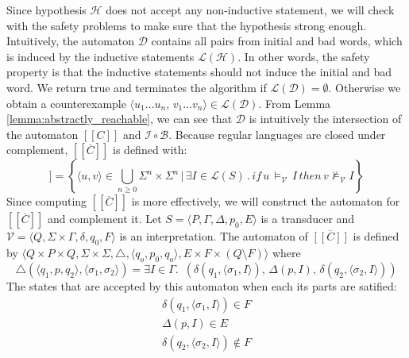 Since hypothesis $\mathcal{H}$ does not accept any 
non-inductive statement, we will check with the safety problems
to make sure that the hypothesis strong enough.
Intuitively, the automaton $\mathcal{D}$ contains all pairs from initial and bad words,
which is induced by the inductive statements $\mathcal{L}(\mathcal{H})$.
In other words, the safety property is that the inductive statements should not induce the
initial and bad word. We return true and terminates the algorithm if $\mathcal{L}(\mathcal{D}) = \emptyset$.
Otherwise we obtain a counterexample 
$\langle u_1 \dots u_n, \, v_1 \dots v_n \rangle \in \mathcal{L}(\mathcal{D})$.
From Lemma \ref{lemma:abstractly_reachable}, we can see that $\mathcal{D}$ is intuitively the intersection of
the automaton $[[C]]$ and $\mathcal{I} \circ  \mathcal{B}$.
Because regular languages are closed under complement, $[[\overline{C}]]$ is defined with:
\begin{equation}
    [[\overline{C}]] = \left\lbrace \langle u,v\rangle \in \bigcup_{n \geq 0} \Sigma^n \times \Sigma^n \, | \, \exists I \in \mathcal{L}(S) \, . \, if \, u \, \models_{\mathcal{V}} \, I \, then \, v \not\models_{\mathcal{V}} I \right\rbrace
\end{equation}
Since computing $[[\overline{C}]]$ is more effectively, we will construct the automaton for $[[\overline{C}]]$ and complement it.
Let $S =  \langle P, \Gamma, \Delta, p_0, E \rangle$ 
is a transducer and  $\mathcal{V} =  \langle Q, \Sigma \times \Gamma, \delta, q_0, F \rangle$ is 
an interpretation. The automaton of $\overline{[[C]]}$ 
is defined by $\langle Q \times P \times Q, \Sigma \times \Sigma, \triangle, \langle q_o,  p_0, q_o \rangle, 
E \times F \times (Q \setminus F) \rangle$ where
\begin{equation*}
    \triangle(\langle q_1, p, q_2 \rangle, \langle \sigma_1, \sigma_2 \rangle) =  \exists I \in \Gamma. \,\,\,
    (\delta(q_1, \langle \sigma_1, I \rangle) ,\, \Delta(p, I) ,\, \delta(q_2, \langle \sigma_2, I \rangle))
\end{equation*}
The states that are accepted by this automaton when each its parts are satified: 
\begin{align*} 
    \delta(q_1, \langle \sigma_1, I \rangle) \in  F \\
    \Delta(p, I) \in E \\
    \delta(q_2, \langle \sigma_2, I \rangle) \notin  F
\end{align*}


